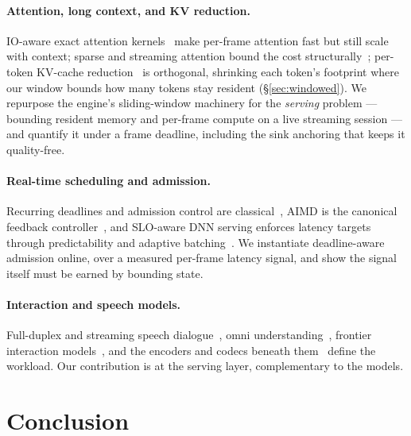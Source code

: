 \paragraph{Attention, long context, and KV reduction.} IO-aware exact attention
kernels~\citep{transformer,flashattn,flashattn2,flashinfer} make per-frame attention fast but still scale
with context; sparse and streaming attention bound the cost
structurally~\citep{transformerxl,sparsetransformer,bigbird,longformer,mistral,streamingllm}; per-token
KV-cache reduction~\citep{mqa,gqa,h2o,scissorhands,snapkv,kivi} is orthogonal, shrinking each token's
footprint where our window bounds how many tokens stay resident (\S\ref{sec:windowed}). We repurpose
the engine's sliding-window machinery for the \emph{serving} problem --- bounding resident memory and
per-frame compute on a live streaming session --- and quantify it under a frame deadline, including
the sink anchoring that keeps it quality-free.

\paragraph{Real-time scheduling and admission.} Recurring deadlines and admission control are
classical~\citep{liulayland}, AIMD is the canonical feedback controller~\citep{aimd,jacobson}, and
SLO-aware DNN serving enforces latency targets through predictability and adaptive
batching~\citep{clockwork,clipper}. We instantiate deadline-aware admission online, over a measured
per-frame latency signal, and show the signal itself must be earned by bounding state.

\paragraph{Interaction and speech models.} Full-duplex and streaming speech
dialogue~\citep{moshi,minicpmo,miniomni,llamaomni}, omni understanding~\citep{qwen25omni,qwen2audio,salmonn},
frontier interaction models~\citep{tmlinteraction}, and the encoders and codecs beneath
them~\citep{whisper,audiolm,valle,encodec} define the workload. Our contribution is at the serving
layer, complementary to the models.

\section{Conclusion}
\label{sec:conclusion}

